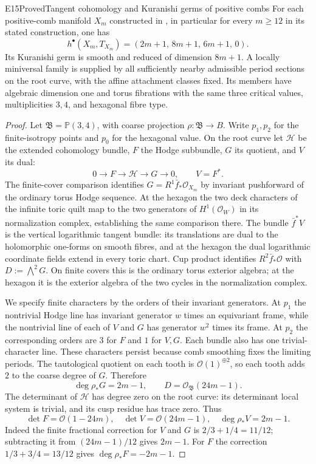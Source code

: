 \begin{statement}{E15}{Proved}{Tangent cohomology and Kuranishi germs of positive combs}
For each positive-comb manifold $X_m$ constructed in
\cite{Viaclovsky2026Combs}, in particular for every $m\geq12$ in
its stated construction, one has
\[
 h^\bullet(X_m,T_{X_m})=(2m+1,\,8m+1,\,6m+1,\,0).
\]
Its Kuranishi germ is smooth and reduced of dimension $8m+1$.
A locally miniversal family is supplied by all sufficiently nearby
admissible period sections on the root curve, with the affine
attachment classes fixed. Its members have algebraic dimension one
and torus fibrations with the same three critical values,
multiplicities $3,4$, and hexagonal fibre type.
\end{statement}
\begin{proof}
Let $\mathfrak B=\mathbb P(3,4)$, with coarse projection
$\rho:\mathfrak B\to B$. Write $p_1,p_2$ for the finite-isotropy
points and $p_0$ for the hexagonal value. On the root curve let
$\mathcal H$ be the extended cohomology bundle, $F$ the Hodge
subbundle, $G$ its quotient, and $V$ its dual:
\[
 0\longrightarrow F\longrightarrow\mathcal H
 \longrightarrow G\longrightarrow0,\qquad V=F^*.
\]
The finite-cover comparison identifies
$G=R^1\bar f_*\mathcal O_{X_m}$ by invariant pushforward of the
ordinary torus Hodge sequence. At the hexagon the two deck
characters of the infinite toric quilt map to the two generators
of $H^1(\mathcal O_W)$ in its normalization complex, establishing
the same comparison there. The bundle $\bar f^*V$ is the vertical
logarithmic tangent bundle: its translations are dual to the
holomorphic one-forms on smooth fibres, and at the hexagon the
dual logarithmic coordinate fields extend in every toric chart.
Cup product identifies $R^2\bar f_*\mathcal O$ with
$D:=\bigwedge^2G$. On finite covers this is the ordinary torus
exterior algebra; at the hexagon it is the exterior algebra of
the two cycles in the normalization complex.

We specify finite characters by the orders of their invariant
generators. At $p_1$ the nontrivial Hodge line has invariant
generator $w$ times an equivariant frame, while the nontrivial
line of each of $V$ and $G$ has generator $w^2$ times its frame.
At $p_2$ the corresponding orders are $3$ for $F$ and $1$ for
$V,G$. Each bundle also has one trivial-character line. These
characters persist because comb smoothing fixes the limiting
periods. The tautological quotient on each tooth is
$\mathcal O(1)^{\oplus2}$, so each tooth adds $2$ to the coarse
degree of $G$. Therefore
\[
 \deg\rho_*G=2m-1,\qquad D=\mathcal O_{\mathfrak B}(24m-1).
\]
The determinant of $\mathcal H$ has degree zero on the root
curve: its determinant local system is trivial, and its cusp
residue has trace zero. Thus
\[
 \det F=\mathcal O(1-24m),\quad
 \det V=\mathcal O(24m-1),\quad
 \deg\rho_*V=2m-1.
\]
Indeed the finite fractional correction for $V$ and $G$ is
$2/3+1/4=11/12$; subtracting it from $(24m-1)/12$ gives
$2m-1$. For $F$ the correction $1/3+3/4=13/12$ gives
$\deg\rho_*F=-2m-1$.


\end{proof}
